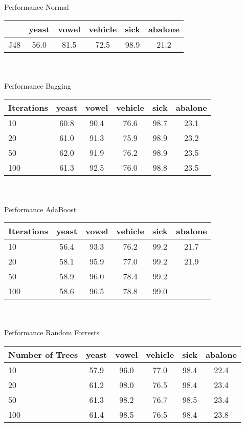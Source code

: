 Performance Normal \\
\begin{tabular}{l|c|c|c|c|c}
	             & yeast & vowel & vehicle &  sick & abalone  \\ \hline
J48              &  56.0 &  81.5 &  72.5   &  98.9 & 21.2     \\ 
\end{tabular}\\ \\


Performance Bagging \\
\begin{tabular}{l|c|c|c|c|c}
Iterations       & yeast & vowel & vehicle &  sick & abalone     \\ \hline
10               &  60.8 & 90.4  &  76.6   & 98.7  &  23.1       \\ \hline
20               &  61.0 & 91.3  &  75.9   & 98.9  &  23.2       \\ \hline
50               &  62.0 & 91.9  &  76.2   & 98.9  &  23.5       \\ \hline
100              &  61.3 & 92.5  &  76.0   & 98.8  &  23.5       \\ 
\end{tabular}\\ \\

Performance AdaBoost \\
\begin{tabular}{l|c|c|c|c|c}
Iterations       & yeast & vowel & vehicle &  sick & abalone     \\ \hline
10               & 56.4  &  93.3 &  76.2   &  99.2 &  21.7       \\ \hline
20               & 58.1  &  95.9 &  77.0   &  99.2 &  21.9       \\ \hline
50               & 58.9  &  96.0 &  78.4   &  99.2 &             \\ \hline
100              & 58.6  &  96.5 &  78.8   &  99.0 &             \\ 
\end{tabular}\\ \\


Performance Random Forrests \\
\begin{tabular}{l|c|c|c|c|c}
Number of Trees  & yeast & vowel & vehicle &  sick & abalone     \\ \hline
10               & 57.9  & 96.0  & 77.0    &  98.4 &  22.4       \\ \hline
20               & 61.2  & 98.0  & 76.5    &  98.4 &  23.4       \\ \hline
50               & 61.3  & 98.2  & 76.7    &  98.5 &  23.4       \\ \hline
100              & 61.4  & 98.5  & 76.5    &  98.4 &  23.8       \\ 
\end{tabular}\\ \\


